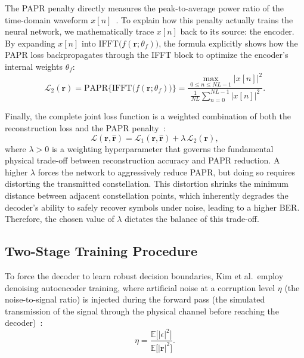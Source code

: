 The PAPR penalty directly measures the peak-to-average power ratio of the time-domain waveform $x[n]$~\cite{kim2017novel}. To explain how this penalty actually trains the neural network, we mathematically trace $x[n]$ back to its source: the encoder. By expanding $x[n]$ into $\mathrm{IFFT}\bigl(f(\bm{r}; \theta_f)\bigr)$, the formula explicitly shows how the PAPR loss backpropagates through the IFFT block to optimize the encoder's internal weights $\theta_f$:
\begin{equation*}
    \mathcal{L}_2(\bm{r})
    = \mathrm{PAPR}\bigl\{\mathrm{IFFT}\bigl(f(\bm{r}; \theta_f)\bigr)\bigr\}
    = \frac{\displaystyle\max_{0 \le n \le NL-1} |x[n]|^2}
    {\displaystyle\frac{1}{NL}\sum_{n=0}^{NL-1}|x[n]|^2}.
\end{equation*}

Finally, the complete joint loss function is a weighted combination of both the reconstruction loss and the PAPR penalty~\cite{kim2017novel}:
\begin{equation*}
    \mathcal{L}(\bm{r},\hat{\bm{r}})
    = \mathcal{L}_1(\bm{r},\hat{\bm{r}}) + \lambda\,\mathcal{L}_2(\bm{r}),
\end{equation*}
where $\lambda > 0$ is a weighting hyperparameter that governs the fundamental physical trade-off between reconstruction accuracy and PAPR reduction. A higher $\lambda$ forces the network to aggressively reduce PAPR, but doing so requires distorting the transmitted constellation. This distortion shrinks the minimum distance between adjacent constellation points, which inherently degrades the decoder's ability to safely recover symbols under noise, leading to a higher BER. Therefore, the chosen value of $\lambda$ dictates the balance of this trade-off.

\subsection{Two-Stage Training Procedure}

To force the decoder to learn robust decision boundaries, Kim et al.\ employ denoising autoencoder training, where artificial noise at a corruption level $\eta$ (the noise-to-signal ratio) is injected during the forward pass (the simulated transmission of the signal through the physical channel before reaching the decoder)~\cite{kim2017novel}:
\begin{equation*}
    \eta = \frac{\mathbb{E}\bigl[|\epsilon|^2\bigr]}
    {\mathbb{E}\bigl[|\bm{r}|^2\bigr]}.
\end{equation*}

